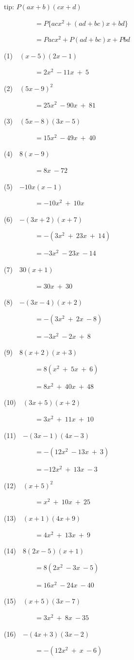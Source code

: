 \documentclass[a4j,twocolumn,10pt,fleqn]{jarticle}
\begin{document}
tip: $P(ax + b)(cx + d)$

~~~~~~~~~$= P\{acx^2 + (ad + bc)x +bd\}$

~~~~~~~~~$= Pacx^2 + P(ad + bc)x + Pbd$

(1)~~$(x-5)(2x-1)$

~~~~~~~~~$=2x^2~-11x~+~5$

(2)~~$(5x-9)^2$

~~~~~~~~~$=25x^2~-90x~+~81$

(3)~~$(5x-8)(3x-5)$

~~~~~~~~~$=15x^2~-49x~+~40$

(4)~~$8(x-9)$

~~~~~~~~~$=8x~-72$

(5)~~$-10x(x-1)$

~~~~~~~~~$=-10x^2~+~10x$

(6)~~$-(3x+2)(x+7)$

~~~~~~~~~$=-(3x^2~+~23x~+~14)$

~~~~~~~~~$=-3x^2~-23x~-14$

(7)~~$30(x+1)$

~~~~~~~~~$=30x~+~30$

(8)~~$-(3x-4)(x+2)$

~~~~~~~~~$=-(3x^2~+~2x~-8)$

~~~~~~~~~$=-3x^2~-2x~+~8$

(9)~~$8(x+2)(x+3)$

~~~~~~~~~$=8(x^2~+~5x~+~6)$

~~~~~~~~~$=8x^2~+~40x~+~48$

(10)~~$(3x+5)(x+2)$

~~~~~~~~~$=3x^2~+~11x~+~10$

(11)~~$-(3x-1)(4x-3)$

~~~~~~~~~$=-(12x^2~-13x~+~3)$

~~~~~~~~~$=-12x^2~+~13x~-3$

(12)~~$(x+5)^2$

~~~~~~~~~$=x^2~+~10x~+~25$

(13)~~$(x+1)(4x+9)$

~~~~~~~~~$=4x^2~+~13x~+~9$

(14)~~$8(2x-5)(x+1)$

~~~~~~~~~$=8(2x^2~-3x~-5)$

~~~~~~~~~$=16x^2~-24x~-40$

(15)~~$(x+5)(3x-7)$

~~~~~~~~~$=3x^2~+~8x~-35$

(16)~~$-(4x+3)(3x-2)$

~~~~~~~~~$=-(12x^2~+~x~-6)$
\end{document}
